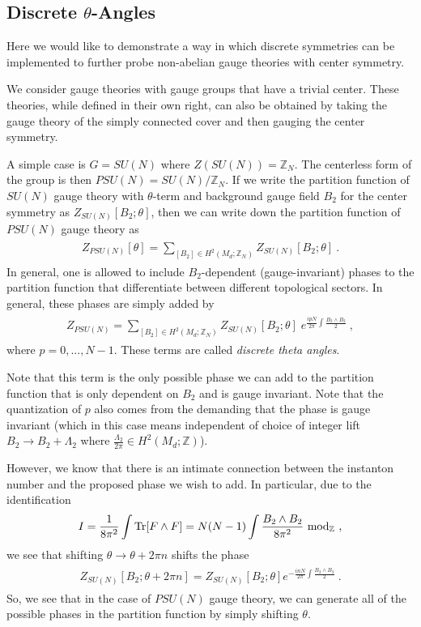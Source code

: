 \documentclass[11pt]{article}
\newcommand{\eq}[1]{\begin{align}\begin{split}#1\end{split}\end{align}}
\newcommand{\twopi}[1]{{\frac{#1}{2\pi}}}
\def\Tr{{\rm Tr}}
\def\IZ{{\mathbb{Z}}}
\begin{document}
\subsection{Discrete $\theta$-Angles}

Here we would like to demonstrate a way in which discrete symmetries can be implemented to further probe non-abelian gauge theories with center symmetry. 

We consider gauge theories with gauge groups that have a trivial center. These theories, while defined in their own right, can also be obtained by taking the gauge theory of the simply connected cover   and then gauging the center symmetry. 

A simple case is $G=SU(N)$ where $Z(SU(N))=\IZ_N$. The centerless form of the group is then $PSU(N)=SU(N)/\IZ_N$. If we write the partition function of $SU(N)$ gauge theory with $\theta$-term and background gauge field $B_2$ for the center symmetry as $Z_{SU(N)}[B_2;\theta]$, then we can write down the partition function of $PSU(N)$ gauge theory as 
\eq{
Z_{PSU(N)}[\theta]=\sum_{[B_2]\in H^2(M_d;\IZ_N)} Z_{SU(N)}[B_2;\theta]~. 
}
In general, one is allowed to include $B_2$-dependent (gauge-invariant) phases to the partition function that differentiate between different topological sectors. In general, these phases are simply added by 
\eq{
Z_{PSU(N)}=\sum_{[B_2]\in H^2(M_d;\IZ_N)} Z_{SU(N)}[B_2;\theta] \; e^{\twopi{i p N} \int \frac{B_2\wedge B_2}{2}}~,
}
where $p=0,...,N-1$.   These terms are called \emph{discrete theta angles}. 

Note that this term is the only possible phase we can add to the partition function that is only dependent on $B_2$ and is gauge invariant. Note that the quantization of $p$ also comes from the demanding that the phase is gauge invariant (which in this case means independent of choice of integer lift $B_2\to B_2+\Lambda_2$ where $\twopi{\Lambda_2}\in H^2(M_d;\IZ)$). 

However, we know that there is an intimate connection between the instanton number and the proposed phase we wish to add. In particular, due to the identification 
\eq{I=
\frac{1}{8\pi^2}\int \Tr[F\wedge F]=N(N-1)\int \frac{B_2\wedge B_2}{8\pi^2}~{\rm mod}_\IZ~,
}
we see that shifting $\theta\to \theta+2\pi n$ shifts the phase 
\eq{
Z_{SU(N)}[B_2;\theta+2\pi n]=Z_{SU(N)}[B_2;\theta]e^{-\twopi{i n N}\int \frac{B_2\wedge B_2}{2}}~. 
}
So, we see that in the case of $PSU(N)$ gauge theory, we can generate all of the possible phases in the partition function by simply shifting $\theta$. 
\end{document}
